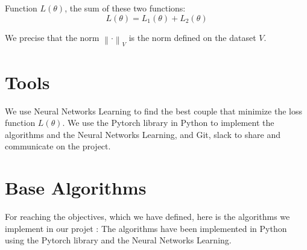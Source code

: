 \documentclass{report}
\begin{document}
    Function $L(\theta)$, the sum of these two functions:
    \[
    L(\theta) = L_1(\theta) + L_2(\theta)
    \]

    We  precise that the norm $\left\lVert \cdot \right\rVert_{V}$ is the norm defined on the dataset $V$.

\section{Tools}
    We use Neural Networks Learning to find the best couple that minimize the loss function $L(\theta)$.
    We use the Pytorch library in Python to implement the algorithms and the Neural Networks Learning, and Git, slack to share and communicate on the project.

\section{Base Algorithms}
    For reaching the objectives, which we have defined, here is the algorithms we implement in our projet  : 
    The algorithms have been implemented in Python using the Pytorch library and the Neural Networks Learning.\\
\end{document}
